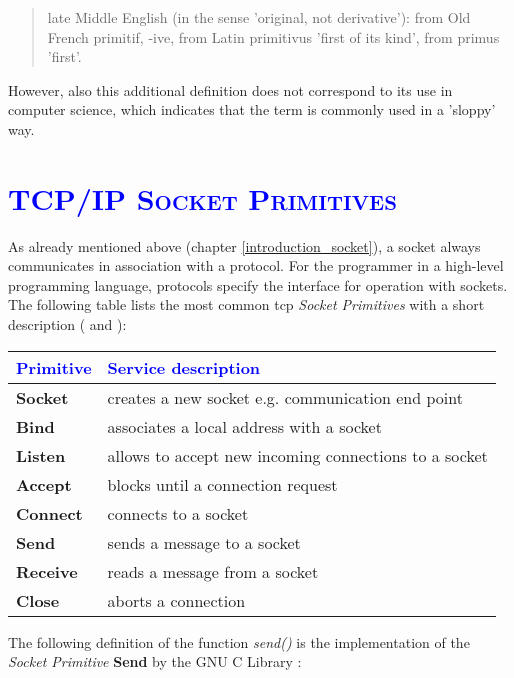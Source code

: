 \documentclass[xcolor=dvipsnames]{article}
\begin{document}
\begin{quote}
late Middle English (in the sense 'original, not derivative'): from Old French primitif, -ive, from Latin primitivus 'first of its kind', from primus 'first'.
\end{quote}

\noindent However, also this additional definition does not correspond to its use in computer science, which indicates that the term is commonly used in a 'sloppy' way. 

\section{\scshape{\textcolor{blue}{TCP/IP Socket Primitives}}} \label{socket_primitives}

As already mentioned above (chapter \ref{introduction_socket}), a socket always communicates in association with a protocol. For the programmer in a high-level programming language, protocols specify the interface for operation with sockets.\\

\noindent The following table lists the most common \gls{tcp} \textit{Socket Primitives} with a short description (\cite{IBM_Anupama} and \cite[p. 142, ch. 4.3.1]{tanenbaum}):\\

\begin{center}
\begin{tabular}{ | l | l | } 
\hline
\textcolor{blue}{\textbf{Primitive}} & \textcolor{blue}{Service description}\\
\hline
\textbf{Socket} & creates a new socket e.g. communication end point\\
\textbf{Bind} & associates a local address with a socket\\
\textbf{Listen} & allows to accept new incoming connections to a socket\\
\textbf{Accept} & blocks until a connection request\\
\textbf{Connect} & connects to a socket\\
\textbf{Send} & sends a message to a socket\\
\textbf{Receive} & reads a message from a socket\\
\textbf{Close} & aborts a connection\\
\hline
\end{tabular}
\end{center}
\label{tab:tcp_primitives}

\noindent The following definition of the function \textit{send()} is the implementation of the \textit{Socket Primitive} \textbf{Send} by the GNU C Library \cite[p. 457, ch. 16.9.5.1]{GNU_C_library_manual}:
\end{document}

